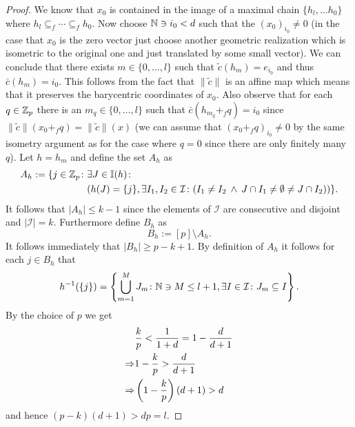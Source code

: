 \begin{proof}
  We know that $x_0$ is contained in the image of a maximal chain $\{h_l, \ldots h_0\}$ where $h_l \subseteq_f \cdots \subseteq_f h_0$.
  Now choose $\mathbb{N} \ni i_0 < d$ such that the $(x_0)_{i_0} \neq 0$ (in the case that $x_0$ is the zero vector just choose another geometric realization which is isometric to the original one and just translated by some small vector). We can conclude that there exists $m \in \{0, \ldots, l\}$ such that $\tilde{c}(h_m) = e_{i_0}$ and thus $\bar{c}(h_m) = i_0$. This follows from the fact that $\lVert \tilde{c} \rVert$ is an affine map which means that it preserves the barycentric coordinates of $x_0$. Also observe that for each $q \in \mathbb{Z}_p$ there is an $m_q \in \{0,\ldots,l\}$ such that $\bar{c}(h_{m_q}+_fq) = i_0$ since $\lVert \tilde{c} \rVert(x_0 +_f q) = \lVert \tilde{c} \rVert(x)$ (we can assume that $(x_0 +_f q)_{i_0} \neq 0$ by the same isometry argument as for the case where $q = 0$ since there are only finitely many $q$). 
  Let $h = h_m$ and define the set $A_h$ as
  \begin{align*} 
    A_h := \{j \in \mathbb{Z}_p\colon &\exists J \in \mathbb{I}(h)\colon\\
    &(h(J) = \{j\}, \exists I_1, I_2 \in \mathcal{I}\colon (I_1\neq I_2 \: \land \: J \cap I_1 \neq \emptyset \neq J \cap I_2)) \}.
  \end{align*}
  It follows that $\left|A_h\right| \leq k-1$ since the elements of $\mathcal{I}$ are consecutive and disjoint and $\left|\mathcal{I}\right| = k$. Furthermore define $B_h$ as \[B_h:= [p] \setminus A_h.\] 
  It follows immediately that $\left|B_h \right| \geq p - k + 1$. By definition of $A_h$ it follows for each $j \in B_h$ that
  \begin{equation*}
    h^{-1}(\{j\}) = \left\{\bigcup\limits_{m=1}^M J_m\colon \mathbb{N} \ni M \leq l+1, \exists I \in \mathcal{I}\colon J_m \subseteq I\right\}.
  \end{equation*}
  By the choice of $p$ we get
  \begin{align*}
    &{k \over p} < {1 \over 1+d} = 1 - {d \over d + 1} \\
    \Rightarrow &1 - {k \over p} > {d \over d+1} \\
    \Rightarrow &\left(1 - {k\over p}\right)(d+1) > d
  \end{align*}
  and hence $(p-k)(d+1) > dp = l$.
  

\end{proof}

